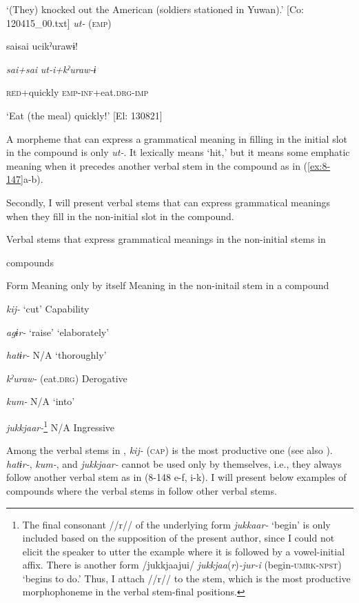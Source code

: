 \glt ‘(They) knocked out the American (soldiers stationed in Yuwan).’ [Co: 120415\_00.txt]
\ex \textit{ut-} (\textsc{emp})

    {\TM}
\glll  saisai  ucikˀurawɨ!

      \textit{sai+sai}  \textit{ut{}-i+kˀuraw-ɨ}

      \textsc{red}+quickly  \textsc{emp}-\textsc{inf}+eat.\textsc{drg}-\textsc{imp}

\glt ‘Eat (the meal) quickly!’ [El: 130821]

A morpheme that can express a grammatical meaning in filling in the initial slot in the compound is only \textit{ut-}. It lexically means ‘hit,’ but it means some emphatic meaning when it precedes another verbal stem in the compound as in (\ref{ex:8-147}a-b).

  Secondly, I will present verbal stems that can express grammatical meanings when they fill in the non-initial slot in the compound.

\begin{table}
\caption{\label{tab:key:87}Verbal stems that express grammatical meanings in the non-initial stems in} \textmd{compounds}

Form    Meaning only by itself    Meaning in the non-initail stem in a compound

\textit{kij-}    ‘cut’    Capability

\textit{agɨr-}    ‘raise’    ‘elaborately’

\textit{hatɨr-}    N/A    ‘thoroughly’

\textit{kˀuraw-}    (eat.\textsc{drg})    Derogative

\textit{kum-}    N/A    ‘into’

\textit{jukkjaar-}\footnote{The final consonant //r// of the underlying form \textit{jukkaar-} ‘begin’ is only included based on the supposition of the present author, since I could not elicit the speaker to utter the example where it is followed by a vowel-initial affix. There is another form /jukkjaajui/ \textit{jukkjaa}(\textit{r})\textit{{}-jur-i} (begin-\textsc{umrk}-\textsc{npst}) ‘begins to do.’ Thus, I attach //r// to the stem, which is the most productive morphophoneme in the verbal stem-final positions.}    N/A    Ingressive
\end{table}

Among the verbal stems in , \textit{kij-} (\textsc{cap}) is the most productive one (see also ). \textit{hatɨr-}, \textit{kum-}, and \textit{jukkjaar-} cannot be used only by themselves, i.e., they always follow another verbal stem as in (8-148 e-f, i-k). I will present below examples of compounds where the verbal stems in  follow other verbal stems.


